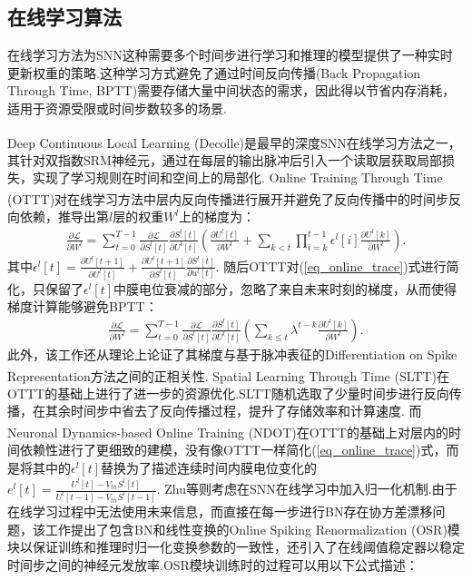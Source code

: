 \documentclass[10.5pt,compsoc,UTF8]{CjC}
\theoremstyle{mystyle}
\newcommand{\upcite}[1]{\textsuperscript{\cite{#1}}}
\begin{document}
\begin{multicols}{1}
\subsection{在线学习算法}%

在线学习方法为SNN这种需要多个时间步进行学习和推理的模型提供了一种实时更新权重的策略.这种学习方式避免了通过时间反向传播(Back Propagation Through Time, BPTT)需要存储大量中间状态的需求，因此得以节省内存消耗，适用于资源受限或时间步数较多的场景.

Deep Continuous Local Learning (Decolle)\upcite{kaiser2020synaptic}是最早的深度SNN在线学习方法之一，其针对双指数SRM神经元，通过在每层的输出脉冲后引入一个读取层获取局部损失，实现了学习规则在时间和空间上的局部化.
Online Training Through Time (OTTT)\upcite{xiao2022online}对在线学习方法中层内反向传播进行展开并避免了反向传播中的时间步反向依赖，推导出第$l$层的权重$W^{l}$上的梯度为：
\begin{align}
	\frac{\partial \mathcal{L}}{\partial W^l} = \sum_{t=0}^{T-1} \frac{\partial \mathcal{L}}{\partial S^l[t]} \frac{\partial S^l[t]}{\partial U^l[t]} \left( \frac{\partial U^l[t]}{\partial W^l} + \sum_{k < t} \prod_{i=k}^{t-1} \epsilon^l[i] \frac{\partial U^l[k]}{\partial W^l} \right). \label{eq_online_trace}
\end{align}
其中$ \epsilon^l[t] = \frac{\partial U^l[t+1]}{\partial U^l[t]} + \frac{\partial U^l[t+1]}{\partial  S^l[t]} \frac{\partial  S^l[t]}{\partial u^l[t]}$.
随后OTTT对(\ref{eq_online_trace})式进行简化，只保留了$ \epsilon^l[t]$中膜电位衰减的部分，忽略了来自未来时刻的梯度，从而使得梯度计算能够避免BPTT：
\begin{align}
	\frac{\partial \mathcal{L}}{\partial W^l} = \sum_{t=0}^{T-1} \frac{\partial \mathcal{L}}{\partial S^l[t]} \frac{\partial S^l[t]}{\partial U^l[t]} \left( \sum_{k \leq t} \lambda^{t-k} \frac{\partial U^l[k]}{\partial W^l} \right).
\end{align}
此外，该工作还从理论上论证了其梯度与基于脉冲表征的Differentiation on Spike Representation方法\upcite{meng2022training}之间的正相关性.
Spatial Learning Through Time (SLTT)\upcite{meng2023towards}在OTTT的基础上进行了进一步的资源优化.SLTT随机选取了少量时间步进行反向传播，在其余时间步中省去了反向传播过程，提升了存储效率和计算速度.
而Neuronal Dynamics-based Online Training (NDOT)\upcite{jiang2024ndot}在OTTT的基础上对层内的时间依赖性进行了更细致的建模，没有像OTTT一样简化(\ref{eq_online_trace})式，而是将其中的$ \epsilon^l[t]$替换为了描述连续时间内膜电位变化的$e^l[t] = \frac{ U^l[t] - V_{th} S^l[t]}{ U^l[t-1] - V_{th}  S^l[t-1]}$.
Zhu等\upcite{zhu2024online}则考虑在SNN在线学习中加入归一化机制.由于在线学习过程中无法使用未来信息，而直接在每一步进行BN存在协方差漂移问题，该工作提出了包含BN和线性变换的Online Spiking Renormalization (OSR)模块以保证训练和推理时归一化变换参数的一致性，还引入了在线阈值稳定器以稳定时间步之间的神经元发放率.OSR模块训练时的过程可以用以下公式描述：

\end{multicols}
\end{document}
